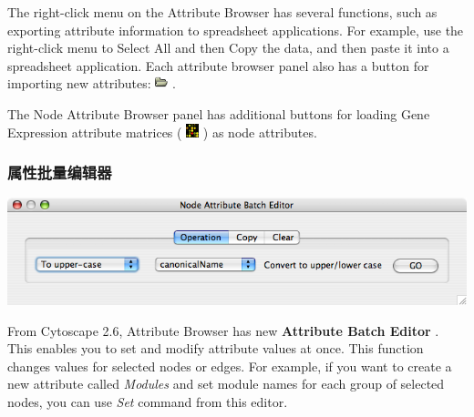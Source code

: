  The right-click menu on the Attribute Browser has several functions, such as
exporting attribute information to spreadsheet applications. For example, use
the right-click menu to Select All and then Copy the data, and then paste it
into a spreadsheet application. Each attribute browser panel also has a button
for importing new attributes:
\includegraphics[width=1em]{images/attributes_import_icon.png}  . 

 The Node Attribute Browser panel has additional buttons for loading Gene
Expression attribute matrices (
\includegraphics[width=1em]{images/attributes_gene_expr_icon.png}  ) as node
attributes. 

\subsubsection{属性批量编辑器}

\includegraphics[width=.5\textwidth]{images/attribute_editor26.png} 

 From Cytoscape 2.6, Attribute Browser has new \textbf{Attribute Batch Editor}
. This enables you to set and modify attribute values at once. This function
changes values for selected nodes or edges. For example, if you want to create
a new attribute called \emph{Modules} and set module names for each group of
selected nodes, you can use \emph{Set} command from this editor. 
